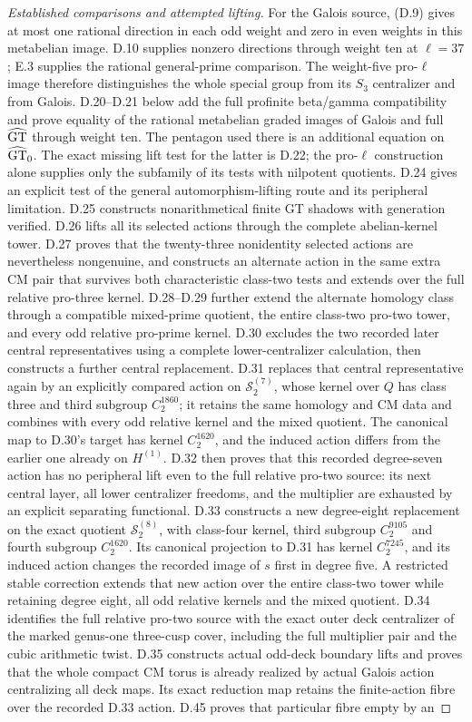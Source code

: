 \begin{proof}[Established comparisons and attempted lifting]
For the Galois source, (D.9) gives at most one rational direction in each odd weight and zero in even weights in this metabelian image. D.10 supplies nonzero directions through weight ten at $\ell=37$; E.3 supplies the rational general-prime comparison. The weight-five pro-$\ell$ image therefore distinguishes the whole special group from its $S_3$ centralizer and from Galois. D.20--D.21 below add the full profinite beta/gamma compatibility and prove equality of the rational metabelian graded images of Galois and full $\widehat{\rm GT}$ through weight ten. The pentagon used there is an additional equation on $\widehat{\rm GT}_0$. The exact missing lift test for the latter is D.22; the pro-$\ell$ construction alone supplies only the subfamily of its tests with nilpotent quotients. D.24 gives an explicit test of the general automorphism-lifting route and its peripheral limitation. D.25 constructs nonarithmetical finite GT shadows with generation verified. D.26 lifts all its selected actions through the complete abelian-kernel tower. D.27 proves that the twenty-three nonidentity selected actions are nevertheless nongenuine, and constructs an alternate action in the same extra CM pair that survives both characteristic class-two tests and extends over the full relative pro-three kernel. D.28--D.29 further extend the alternate homology class through a compatible mixed-prime quotient, the entire class-two pro-two tower, and every odd relative pro-prime kernel. D.30 excludes the two recorded later central representatives using a complete lower-centralizer calculation, then constructs a further central replacement. D.31 replaces that central representative again by an explicitly compared action on $\mathcal S_2^{(7)}$, whose kernel over $Q$ has class three and third subgroup $C_2^{1860}$; it retains the same homology and CM data and combines with every odd relative kernel and the mixed quotient. The canonical map to D.30's target has kernel $C_2^{1620}$, and the induced action differs from the earlier one already on $H^{(1)}$. D.32 then proves that this recorded degree-seven action has no peripheral lift even to the full relative pro-two source: its next central layer, all lower centralizer freedoms, and the multiplier are exhausted by an explicit separating functional. D.33 constructs a new degree-eight replacement on the exact quotient $\mathcal S_2^{(8)}$, with class-four kernel, third subgroup $C_2^{9105}$ and fourth subgroup $C_2^{1620}$. Its canonical projection to D.31 has kernel $C_2^{7245}$, and its induced action changes the recorded image of $s$ first in degree five. A restricted stable correction extends that new action over the entire class-two tower while retaining degree eight, all odd relative kernels and the mixed quotient. D.34 identifies the full relative pro-two source with the exact outer deck centralizer of the marked genus-one three-cusp cover, including the full multiplier pair and the cubic arithmetic twist. D.35 constructs actual odd-deck boundary lifts and proves that the whole compact CM torus is already realized by actual Galois action centralizing all deck maps. Its exact reduction map retains the finite-action fibre over the recorded D.33 action. D.45 proves that particular fibre empty by an 
\end{proof}
